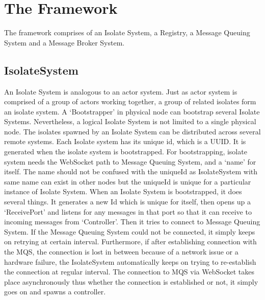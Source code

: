 \section{The Framework}
The framework comprises of an Isolate System, a Registry, a Message Queuing System and a Message Broker System.
  \subsection{IsolateSystem}
  An Isolate System is analogous to an actor system. Just as actor system is comprised of a group of actors working together, a group of related isolates form an isolate system. A ‘Bootstrapper’ in physical node can bootstrap several Isolate Systems. Nevertheless, a logical Isolate System is not limited to a single physical node. The isolates spawned by an Isolate System can be distributed across several remote systems.
  Each Isolate system has its unique id, which is a UUID. It is generated when the isolate system is bootstrapped. For bootstrapping, isolate system needs the WebSocket path to Message Queuing System, and a ‘name’ for itself. The name should not be confused with the uniqueId as IsolateSystem with same name can exist in other nodes but the uniqueId is unique for a particular instance of Isolate System.
  When an Isolate System is bootstrapped, it does several things. It generates a new Id which is unique for itself, then opens up a ‘ReceivePort’ and listens for any messages in that port so that it can receive to incoming messages from ‘Controller’. Then it tries to connect to Message Queuing System. If the Message Queuing System could not be connected, it simply keeps on retrying at certain interval. Furthermore, if after establishing connection with the MQS, the connection is lost in between because of a network issue or a hardware failure, the IsolateSystem automatically keeps on trying to re-establish the connection at regular interval. The connection to MQS via WebSocket takes place asynchronously thus whether the connection is established or not, it simply goes on and spawns a controller.

